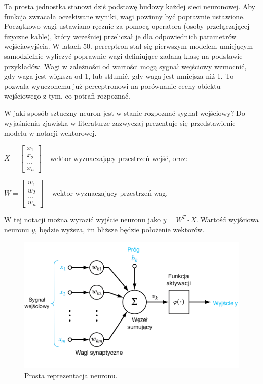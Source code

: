 \documentclass[12pt,a4paper,twoside,titlepage,openright]{book}
\begin{document}
Ta prosta jednostka stanowi dziś podstawę budowy każdej sieci neuronowej. Aby funkcja zwracała oczekiwane wyniki, wagi powinny być poprawnie ustawione. Początkowo wagi ustawiano ręcznie za pomocą operatora (osoby przełączającej fizyczne kable), który wcześniej przeliczał je dla odpowiednich parametrów wejścia\/wyjścia. W latach 50. perceptron stał się pierwszym modelem umiejącym samodzielnie wyliczyć poprawnie wagi definiujące zadaną klasę na podstawie przykładów. Wagi w zależności od wartości mogą sygnał wejściowy wzmocnić, gdy waga jest większa od 1, lub stłumić, gdy waga jest mniejsza niż 1. To pozwala wyuczonemu już perceptronowi na porównanie cechy obiektu wejściowego z tym, co potrafi rozpoznać.

W jaki sposób sztuczny neuron jest w stanie rozpoznać sygnał wejściowy? Do wyjaśnienia zjawiska w literaturze zazwyczaj prezentuje się przedstawienie modelu w notacji wektorowej.


\(X = \begin{bmatrix} x_{1} \\ x_{2} \\ \dots \\ x_{n} \end{bmatrix} \) -- wektor wyznaczający przestrzeń wejść, oraz:


\(W = \begin{bmatrix} w_{1} \\ w_{2} \\ \dots \\ w_{n} \end{bmatrix} \) -- wektor wyznaczający przestrzeń wag.

W tej notacji można wyrazić wyjście neuronu jako \(y= W^T \cdot X\). Wartość wyjściowa neuronu \(y\), będzie wyższa, im bliższe będzie położenie wektorów. \cite{sieciNeuronowe}

\begin{figure}[ht]
	\centering
			\includegraphics[resolution=100, scale=0.7]{Neuron.png}
		\caption{Prosta reprezentacja neuronu.}
\end{figure}
\end{document}
